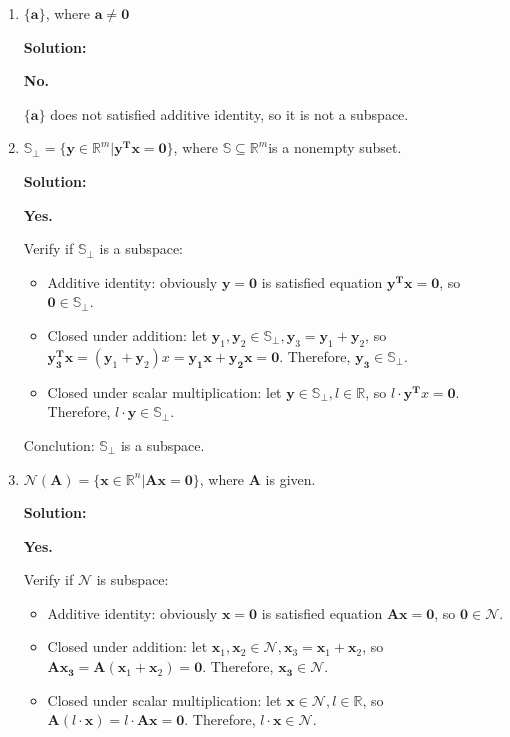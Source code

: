 \documentclass[12pt, letterpaper, onecolumn]{article}
\begin{document}
\begin{enumerate}[start=2]
{\begin{enumerate}
                Conclution: $\mathbb{X}\oplus\mathbb{Y}$ is a subspace.
				
				\item %
				$\{\bm{a}\}$, where $\bm{a}\neq\bm{0}$

				\textbf{Solution:}
                
                \textbf{No.}

                $\{\bm{a}\}$ does not satisfied additive identity, so it is not a subspace.

				\item %
				$\mathbb{S}_\perp=\{\bm{y}\in\mathbb{R}^m|\bm{y^Tx}=\bm{0}\}$, %
				where $\mathbb{S}\subseteq\mathbb{R}^m$is a nonempty subset.

				\textbf{Solution:}

                \textbf{Yes.}

                Verify if $\mathbb{S}_\perp$ is a subspace:

                \begin{itemize}
                    \item Additive identity: obviously $\bm{y} = \bm{0}$ is satisfied equation $\bm{y^Tx}=\bm{0}$, so $\bm{0} \in \mathbb{S}_\perp$.
                    \item Closed under addition: let $\bm{y}_1, \bm{y}_2 \in \mathbb{S}_\perp, \bm{y}_3 = \bm{y}_1 + \bm{y}_2$, so $\bm{y_3^Tx} = (\bm{y}_1 + \bm{y}_2)x = \bm{y_1x} + \bm{y_2x} = \bm{0}$. Therefore, $\bm{y_3} \in \mathbb{S}_\perp$.
                    \item Closed under scalar multiplication: let $\bm{y} \in \mathbb{S}_\perp, l \in \mathbb{R}$, so $l\cdot\bm{y^T}x = \bm{0}$. Therefore, $l\cdot\bm{y} \in \mathbb{S}_\perp$.
                \end{itemize}

                Conclution: $\mathbb{S}_\perp$ is a subspace.

				\item %
				$\mathcal{N}(\bm{A})=\{\bm{x}\in\mathbb{R}^n|\bm{Ax}=\bm{0}\}$, where $\bm{A}$ is given.

				\textbf{Solution:}

                \textbf{Yes.}

                Verify if $\mathcal{N}$ is subspace:
                \begin{itemize}
                    \item Additive identity: obviously $\bm{x} = \bm{0}$ is satisfied equation $\bm{Ax}=\bm{0}$, so $\bm{0} \in \mathcal{N}$.
                    \item Closed under addition: let $\bm{x}_1, \bm{x}_2 \in \mathcal{N}, \bm{x}_3 = \bm{x}_1 + \bm{x}_2$, so $\bm{Ax_3} = \bm{A}(\bm{x}_1 + \bm{x}_2) = \bm{0}$. Therefore, $\bm{x_3} \in \mathcal{N}$.
                    \item Closed under scalar multiplication: let $\bm{x} \in \mathcal{N}, l \in \mathbb{R}$, so $\bm{A}(l\cdot\bm{x}) = l\cdot \bm{Ax} = \bm{0}$. Therefore, $l\cdot\bm{x} \in \mathcal{N}$.
                \end{itemize}
				

\end{enumerate}}
\end{enumerate}
\end{document}
